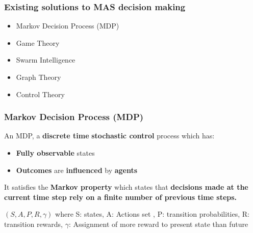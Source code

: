 \documentclass{beamer}
\begin{document}
	\begin{frame}
		\frametitle{Existing solutions to MAS decision making}
		\begin{itemize}
			\item Markov Decision Process (MDP)
			\item Game Theory
			\item Swarm Intelligence
			\item Graph Theory
			\item Control Theory
		\end{itemize}
	\end{frame}

	\begin{frame}
		\frametitle{Markov Decision Process (MDP)}
		
		An MDP, a \textbf{discrete time} \textbf{stochastic control} process which has:
		\begin{itemize}
			\item \textbf{Fully observable} states
			\item \textbf{Outcomes} are \textbf{influenced} by \textbf{agents}
		\end{itemize}
		
		\vspace{0.1in}
		It satisfies the \textbf{Markov property} which states that \textbf{decisions made at the current time step	rely on a finite number of previous time steps.} 
		
		\vspace{0.1in}
		$(S, A, P, R, \gamma )$ where S: states, A: Actions set , P: transition probabilities, R: transition rewards, $\gamma$: Assignment of more reward to present state than future
	\end{frame}
\end{document}
